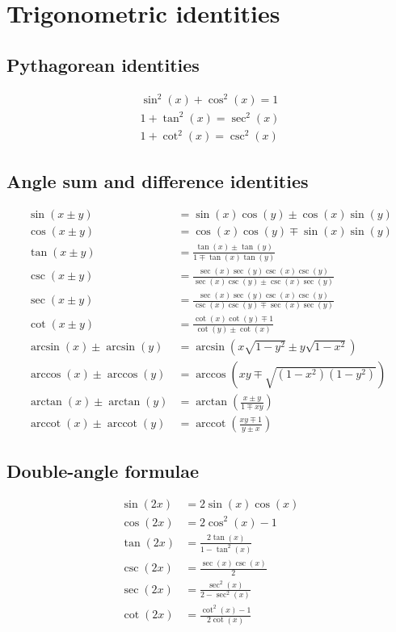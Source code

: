 \documentclass{article}
\title{}
\date{\today}
\DeclareMathOperator{\arccot}{arccot}
\begin{document}
\maketitle
\tableofcontents

\section{Trigonometric identities}

\subsection{Pythagorean identities}
\begin{align}
\sin^2(x)+\cos^2(x)=1\\
1+\tan^2(x)=\sec^2(x)\\
1+\cot^2(x)=\csc^2(x)
\end{align}

\subsection{Angle sum and difference identities}
\begin{align}
\sin(x\pm y)&=\sin(x)\cos(y)\pm\cos(x)\sin(y)\\
\cos(x\pm y)&=\cos(x)\cos(y)\mp\sin(x)\sin(y)\\
\tan(x\pm y)&=\frac{\tan(x)\pm\tan(y)}{1\mp\tan(x)\tan(y)}\\
\csc(x\pm y)&=\frac{\sec(x)\sec(y)\csc(x)\csc(y)}{\sec(x)\csc(y)\pm\csc(x)\sec(y)}\\
\sec(x\pm y)&=\frac{\sec(x)\sec(y)\csc(x)\csc(y)}{\csc(x)\csc(y)\mp\sec(x)\sec(y)}\\
\cot(x\pm y)&=\frac{\cot(x)\cot(y)\mp1}{\cot(y)\pm\cot(x)}\\
\arcsin(x)\pm\arcsin(y)&=\arcsin\left(x\sqrt{1-y^2}\pm y\sqrt{1-x^2}\right)\\
\arccos(x)\pm\arccos(y)&=\arccos\left(xy\mp\sqrt{\left(1-x^2\right)\left(1-y^2\right)}\right)\\
\arctan(x)\pm\arctan(y)&=\arctan\left(\frac{x\pm y}{1\mp xy}\right)\\
\arccot(x)\pm\arccot(y)&=\arccot\left(\frac{xy\mp 1}{y\pm x}\right)
\end{align}

\subsection{Double-angle formulae}
\begin{align}
\sin(2x)&=2\sin(x)\cos(x)\\
\cos(2x)&=2\cos^2(x)-1\\
\tan(2x)&=\frac{2\tan(x)}{1-\tan^2(x)}\\
\csc(2x)&=\frac{\sec(x)\csc(x)}{2}\\
\sec(2x)&=\frac{\sec^2(x)}{2-\sec^2(x)}\\
\cot(2x)&=\frac{\cot^2(x)-1}{2\cot(x)}
\end{align}
\end{document}
